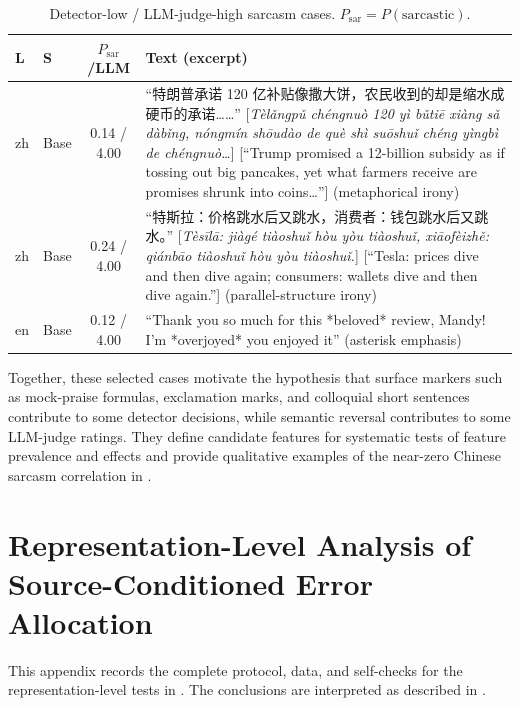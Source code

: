 \begin{table}[!htbp]
  \centering
  \scriptsize
  \setlength{\tabcolsep}{2pt}
  \begin{tabular}{@{}llc>{\raggedright\arraybackslash}p{4.9cm}@{}}
    \toprule
    \textbf{L} & \textbf{S} & \textbf{$P_{\text{sar}}$/LLM} & \textbf{Text (excerpt)} \\
    \midrule
    zh & Base & 0.14 / 4.00 & ``特朗普承诺 120 亿补贴像撒大饼，农民收到的却是缩水成硬币的承诺……'' [\textit{Tèlǎngpǔ chéngnuò 120 yì bǔtiē xiàng sǎ dàbǐng, nóngmín shōudào de què shì suōshuǐ chéng yìngbì de chéngnuò\dots}] [``Trump promised a 12-billion subsidy as if tossing out big pancakes, yet what farmers receive are promises shrunk into coins\dots''] (metaphorical irony) \\
    zh & Base & 0.24 / 4.00 & ``特斯拉：价格跳水后又跳水，消费者：钱包跳水后又跳水。'' [\textit{Tèsīlā: jiàgé tiàoshuǐ hòu yòu tiàoshuǐ, xiāofèizhě: qiánbāo tiàoshuǐ hòu yòu tiàoshuǐ.}] [``Tesla: prices dive and then dive again; consumers: wallets dive and then dive again.''] (parallel-structure irony) \\
    en & Base & 0.12 / 4.00 & ``Thank you so much for this *beloved* review, Mandy! I'm *overjoyed* you enjoyed it'' (asterisk emphasis) \\
    \bottomrule
  \end{tabular}
  \caption{Detector-low / LLM-judge-high sarcasm cases. $P_{\text{sar}} = P(\text{sarcastic})$.}
  \label{tab:cases-fn}
\end{table}

Together, these selected cases motivate the hypothesis that surface markers such as mock-praise formulas, exclamation marks, and colloquial short sentences contribute to some detector decisions, while semantic reversal contributes to some LLM-judge ratings. They define candidate features for systematic tests of feature prevalence and effects and provide qualitative examples of the near-zero Chinese sarcasm correlation in .

\section{Representation-Level Analysis of Source-Conditioned Error Allocation}
\label{app:repr}

This appendix records the complete protocol, data, and self-checks for the representation-level tests in . The conclusions are interpreted as described in .

